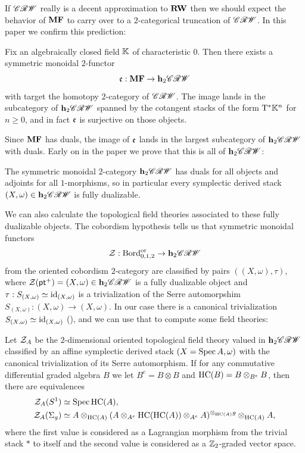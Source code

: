 If $\mathscr{CRW}$ really is a decent approximation to $\mathbf{RW}$ then we should expect the behavior of $\mathbf{MF}$ to carry over to a $2$-categorical truncation of $\mathscr{CRW}$. In this paper we confirm this prediction:
\begin{mainthm} \label{thm:mainA}
	Fix an algebraically closed field $\mathbb{K}$ of characteristic $0$. Then there exists a symmetric monoidal $2$-functor
	\begin{equation*}
		\mathfrak{e} : \mathbf{MF} \to \mathbf{h}_2 \mathscr{CRW}
	\end{equation*}
	with target the homotopy $2$-category of $\mathscr{CRW}$. The image lands in the subcategory of $\mathbf{h}_2 \mathscr{CRW}$ spanned by the cotangent stacks of the form $\mathrm{T}^\ast \mathbb{K}^{n}$ for $n \geq 0$, and in fact $\mathfrak{e}$ is surjective on those objects.
\end{mainthm}

Since $\mathbf{MF}$ has duals, the image of $\mathfrak{e}$ lands in the largest subcategory of $\mathbf{h}_2 \mathscr{CRW}$ with duals. Early on in the paper we prove that this is all of $\mathbf{h}_2 \mathscr{CRW}$:

\begin{mainthm} \label{thm:mainB}
	The symmetric monoidal $2$-category $\mathbf{h}_2 \mathscr{CRW}$ has duals for all objects and adjoints for all $1$-morphisms, so in particular every symplectic derived stack $(X, \omega) \in \mathbf{h}_2 \mathscr{CRW}$ is fully dualizable. 
\end{mainthm}

We can also calculate the topological field theories associated to these fully dualizable objects. The cobordism hypothesis tells us that symmetric monoidal functors
\begin{equation*}
	\mathcal{Z} : \mathrm{Bord}_{0,1,2}^{\mathrm{or}} \to \mathbf{h}_2 \mathscr{CRW}
\end{equation*}
from the oriented cobordism $2$-category are classified by pairs $((X, \omega), \tau)$, where $\mathcal{Z}(\mathsf{pt}^+) = (X, \omega) \in \mathbf{h}_2 \mathscr{CRW}$ is a fully dualizable object and $\tau : S_{(X, \omega)} \simeq \mathrm{id}_{(X, \omega)}$ is a trivialization of the Serre automorpshim $S_{(X, \omega)} : (X, \omega) \to (X, \omega)$. In our case there is a canonical trivialization $S_{(X, \omega)} \simeq \mathrm{id}_{(X, \omega)}$ (), and we can use that to compute some field theories:

\begin{mainthm} \label{thm:mainC}
	Let $\mathcal{Z}_A$ be the $2$-dimensional oriented topological field theory valued in $\mathbf{h}_2 \mathscr{CRW}$ classified by an affine symplectic derived stack $(X = \operatorname{Spec} A, \omega)$ with the canonical trivialization of its Serre automorphism. If for any commutative differential graded algebra $B$ we let $B^e = B \otimes B$ and $\mathrm{HC}(B) = B \otimes_{B^e} B$, then there are equivalences
	\begin{align*}
		\mathcal{Z}_A(S^1) & \simeq \operatorname{Spec} \mathrm{HC}(A), \\
		\mathcal{Z}_A(\Sigma_g) & \simeq A \otimes_{\mathrm{HC}(A)} (A \otimes_{A^e} \mathrm{HC}(\mathrm{HC}(A)) \otimes_{A^e} A)^{\otimes_{\mathrm{HC}(A)} g} \otimes_{\mathrm{HC}(A)} A,
	\end{align*}
	where the first value is considered as a Lagrangian morphism from the trivial stack $\ast$ to itself and the second value is considered as a $\mathbb{Z}_2$-graded vector space.
\end{mainthm}

